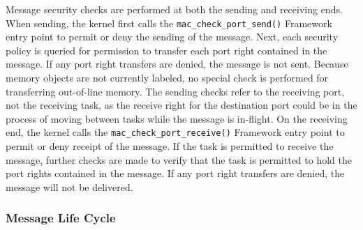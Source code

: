 Message security checks are performed at both the sending and
receiving ends.  When sending, the kernel first calls the
{\tt mac\_check\_port\_send()} Framework entry point to permit or deny
the sending of the message.  Next, each security policy is queried
for permission to transfer each port right contained in the message.
If any port right transfers are denied, the message is not sent.
Because memory objects are not currently labeled, no special check
is performed for transferring out-of-line memory.  The sending
checks refer to the receiving port, not the receiving task, as the
receive right for the destination port could be in the process of
moving between tasks while the message is in-flight.  On the receiving
end, the kernel calls the {\tt mac\_check\_port\_receive()} Framework
entry point to permit or deny receipt of the message.  If the task
is permitted to receive the message, further checks are made to
verify that the task is permitted to hold the port rights contained
in the message.  If any port right transfers are denied, the message
will not be delivered.

\subsubsection{Message Life Cycle}

